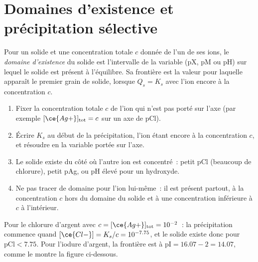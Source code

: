\section{Domaines d'existence et précipitation sélective}\label{sec:b1:precipitation:domains}

\begin{definition}\label{def:b1:precipitation:existence-domain}
Pour un solide et une concentration totale $c$ donnée de l'un de ses
ions, le \emph{domaine d'existence} du solide
est l'intervalle de la variable (pX, pM ou pH) sur lequel le solide est
présent à l'équilibre. Sa frontière est la valeur pour laquelle apparaît
le premier grain de solide, lorsque $Q_s = K_s$ avec l'ion encore à la
concentration $c$.
\end{definition}

\begin{method}\label{met:b1:precipitation:existence-domain}
\begin{enumerate}
  \item Fixer la concentration totale $c$ de l'ion qui n'est pas porté
        sur l'axe (par exemple $[\ce{Ag+}]_{\mathrm{tot}} = c$ sur un axe
        de pCl).
  \item Écrire $K_s$ au début de la précipitation, l'ion étant encore à
        la concentration $c$, et résoudre en la variable portée sur l'axe.
  \item Le solide existe du côté où l'autre ion est concentré~: petit pCl
        (beaucoup de chlorure), petit pAg, ou pH élevé pour un hydroxyde.
  \item Ne pas tracer de domaine pour l'ion lui-même~: il est présent
        partout, à la concentration $c$ hors du domaine du solide et à une
        concentration inférieure à $c$ à l'intérieur.
\end{enumerate}
\end{method}

Pour le chlorure d'argent avec $c = [\ce{Ag+}]_{\mathrm{tot}} = 10^{-2}$~:
la précipitation commence quand $[\ce{Cl-}] = K_s/c = 10^{-7.75}$, et le
solide existe donc pour $\mathrm{pCl} < 7.75$. Pour l'iodure d'argent, la
frontière est à $\mathrm{pI} = 16.07 - 2 = 14.07$, comme le montre la
figure ci-dessous.

